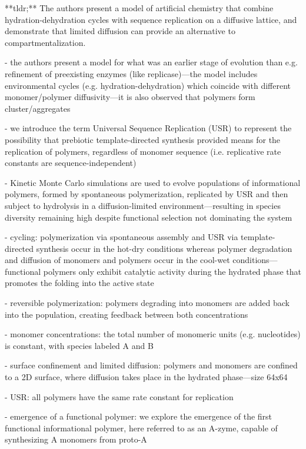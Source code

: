 \documentclass[11pt]{article}
\begin{document}
\begin{markdown}

**tldr;** The authors present a model of artificial chemistry that combine hydration-dehydration cycles with sequence replication on a diffusive lattice, and demonstrate that limited diffusion can provide an alternative to compartmentalization.

- the authors present a model for what was an earlier stage of evolution than e.g. refinement of preexisting enzymes (like replicase)—the model includes environmental cycles (e.g. hydration-dehydration) which coincide with different monomer/polymer diffusivity—it is also observed that polymers form cluster/aggregates
    
- we introduce the term Universal Sequence Replication (USR) to represent the possibility that prebiotic template-directed synthesis provided means for the replication of polymers, regardless of monomer sequence (i.e. replicative rate constants are sequence-independent)
    
- Kinetic Monte Carlo simulations are used to evolve populations of informational polymers, formed by spontaneous polymerization, replicated by USR and then subject to hydrolysis in a diffusion-limited environment—resulting in species diversity remaining high despite functional selection not dominating the system
    
- cycling: polymerization via spontaneous assembly and USR via template-directed synthesis occur in the hot-dry conditions whereas polymer degradation and diffusion of monomers and polymers occur in the cool-wet conditions—functional polymers only exhibit catalytic activity during the hydrated phase that promotes the folding into the active state
    
- reversible polymerization: polymers degrading into monomers are added back into the population, creating feedback between both concentrations
    
- monomer concentrations: the total number of monomeric units (e.g. nucleotides) is constant, with species labeled A and B
    
- surface confinement and limited diffusion: polymers and monomers are confined to a 2D surface, where diffusion takes place in the hydrated phase—size 64x64
    
- USR: all polymers have the same rate constant for replication
    
- emergence of a functional polymer: we explore the emergence of the first functional informational polymer, here referred to as an A-zyme, capable of synthesizing A monomers from proto-A
    

\end{markdown}
\end{document}
